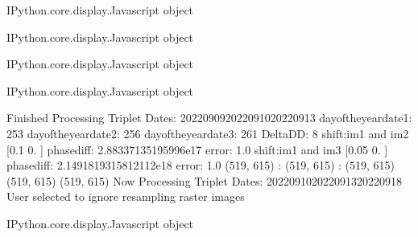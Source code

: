 \documentclass[letterpaper,10pt]{sphinxmanual}
\begin{document}
\begin{sphinxVerbatim}[commandchars=\\\{\}]
\PYGZlt{}IPython.core.display.Javascript object\PYGZgt{}
\end{sphinxVerbatim}



\begin{sphinxVerbatim}[commandchars=\\\{\}]
\PYGZlt{}IPython.core.display.Javascript object\PYGZgt{}
\end{sphinxVerbatim}



\begin{sphinxVerbatim}[commandchars=\\\{\}]
\PYGZlt{}IPython.core.display.Javascript object\PYGZgt{}
\end{sphinxVerbatim}



\begin{sphinxVerbatim}[commandchars=\\\{\}]
\PYGZlt{}IPython.core.display.Javascript object\PYGZgt{}
\end{sphinxVerbatim}



\begin{sphinxVerbatim}[commandchars=\\\{\}]
Finished Processing Triplet Dates:  20220909\PYGZhy{}20220910\PYGZhy{}20220913
day\PYGZus{}of\PYGZus{}the\PYGZus{}year\PYGZus{}date1:  253
\PYGZhy{}\PYGZhy{}\PYGZhy{}\PYGZhy{}\PYGZhy{}\PYGZhy{}\PYGZhy{}\PYGZhy{}\PYGZhy{}\PYGZhy{}\PYGZhy{}\PYGZhy{}\PYGZhy{}\PYGZhy{}\PYGZhy{}\PYGZhy{}\PYGZhy{}\PYGZhy{}\PYGZhy{}\PYGZhy{}\PYGZhy{}
day\PYGZus{}of\PYGZus{}the\PYGZus{}year\PYGZus{}date2:  256
\PYGZhy{}\PYGZhy{}\PYGZhy{}\PYGZhy{}\PYGZhy{}\PYGZhy{}\PYGZhy{}\PYGZhy{}\PYGZhy{}\PYGZhy{}\PYGZhy{}\PYGZhy{}\PYGZhy{}\PYGZhy{}\PYGZhy{}\PYGZhy{}\PYGZhy{}\PYGZhy{}\PYGZhy{}\PYGZhy{}\PYGZhy{}
day\PYGZus{}of\PYGZus{}the\PYGZus{}year\PYGZus{}date3:  261
\PYGZhy{}\PYGZhy{}\PYGZhy{}\PYGZhy{}\PYGZhy{}\PYGZhy{}\PYGZhy{}\PYGZhy{}\PYGZhy{}\PYGZhy{}\PYGZhy{}\PYGZhy{}\PYGZhy{}\PYGZhy{}\PYGZhy{}\PYGZhy{}\PYGZhy{}\PYGZhy{}\PYGZhy{}\PYGZhy{}\PYGZhy{}
Delta\PYGZus{}DD: 8
shift:im1 and im2 [0.1 0. ] phasediff: \PYGZhy{}2.88337135195996e\PYGZhy{}17 error: 1.0
shift:im1 and im3 [\PYGZhy{}0.05  0.  ] phasediff: \PYGZhy{}2.1491819315812112e\PYGZhy{}18 error: 1.0
(519, 615) :  (519, 615) :  (519, 615)
(519, 615)
(519, 615)
Now Processing Triplet Dates:  20220910\PYGZhy{}20220913\PYGZhy{}20220918
 User selected to ignore resampling raster images 



\PYGZlt{}IPython.core.display.Javascript object\PYGZgt{}
\end{sphinxVerbatim}
\end{document}

